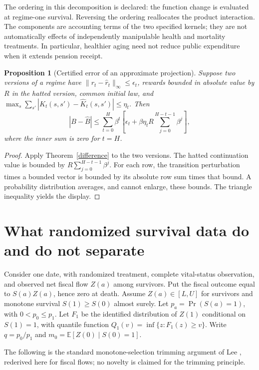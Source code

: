 \documentclass[11pt]{article}
\newtheorem{proposition}[theorem]{Proposition}
\theoremstyle{remark}
\newcommand{\E}{\mathbb E}
\begin{document}
The ordering in this decomposition is declared: the function change is evaluated at regime-one survival. Reversing the ordering reallocates the product interaction. The components are accounting terms of the two specified kernels; they are not automatically effects of independently manipulable health and mortality treatments. In particular, healthier aging need not reduce public expenditure when it extends pension receipt.

\begin{proposition}[Certified error of an approximate projection]
Suppose two versions of a regime have $\|r_t-\widehat r_t\|_\infty\leq\epsilon_t$, rewards bounded in absolute value by $R$ in the hatted version, common initial law, and $\max_s\sum_{s'}|K_t(s,s')-\widehat K_t(s,s')|\leq\eta_t$. Then
\[
 |B-\widehat B|\leq\sum_{t=0}^H\beta^t
 \left[\epsilon_t+\beta\eta_t R\sum_{j=0}^{H-t-1}\beta^j\right],
\]
where the inner sum is zero for $t=H$.
\end{proposition}
\begin{proof}
Apply Theorem~\ref{difference} to the two versions. The hatted continuation value is bounded by $R\sum_{j=0}^{H-t-1}\beta^j$. For each row, the transition perturbation times a bounded vector is bounded by its absolute row sum times that bound. A probability distribution averages, and cannot enlarge, these bounds. The triangle inequality yields the display.
\end{proof}

\section{What randomized survival data do and do not separate}
Consider one date, with randomized treatment, complete vital-status observation, and observed net fiscal flow $Z(a)$ among survivors. Put the fiscal outcome equal to $S(a)Z(a)$, hence zero at death. Assume $Z(a)\in[L,U]$ for survivors and monotone survival $S(1)\geq S(0)$ almost surely. Let $p_a=\Pr(S(a)=1)$, with $0<p_0\leq p_1$. Let $F_1$ be the identified distribution of $Z(1)$ conditional on $S(1)=1$, with quantile function $Q_1(v)=\inf\{z:F_1(z)\geq v\}$. Write $q=p_0/p_1$ and $m_0=\E[Z(0)\mid S(0)=1]$.

The following is the standard monotone-selection trimming argument of Lee \cite{lee}, rederived here for fiscal flows; no novelty is claimed for the trimming principle.
\end{document}
